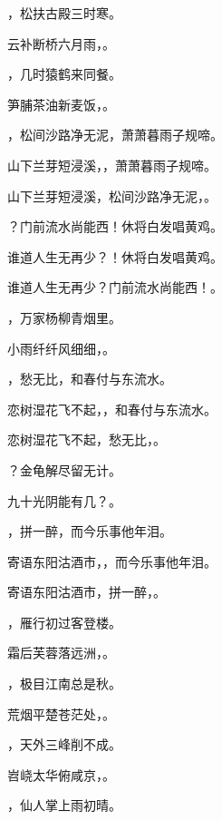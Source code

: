 \documentclass[12pt, a4paper, addpoints, answers]{exam}
\begin{document}
\begin{questions}
\question[3] ，松扶古殿三时寒。

\question[3] 云补断桥六月雨，。

\question[3] ，几时猿鹤来同餐。

\question[3] 笋脯茶油新麦饭，。

\question[3] ，松间沙路净无泥，萧萧暮雨子规啼。

\question[3] 山下兰芽短浸溪，，萧萧暮雨子规啼。

\question[3] 山下兰芽短浸溪，松间沙路净无泥，。

\question[3] ？门前流水尚能西！休将白发唱黄鸡。

\question[3] 谁道人生无再少？！休将白发唱黄鸡。

\question[3] 谁道人生无再少？门前流水尚能西！。

\question[3] ，万家杨柳青烟里。

\question[3] 小雨纤纤风细细，。

\question[3] ，愁无比，和春付与东流水。

\question[3] 恋树湿花飞不起，，和春付与东流水。

\question[3] 恋树湿花飞不起，愁无比，。

\question[3] ？金龟解尽留无计。

\question[3] 九十光阴能有几？。

\question[3] ，拼一醉，而今乐事他年泪。

\question[3] 寄语东阳沽酒市，，而今乐事他年泪。

\question[3] 寄语东阳沽酒市，拼一醉，。

\question[3] ，雁行初过客登楼。

\question[3] 霜后芙蓉落远洲，。

\question[3] ，极目江南总是秋。

\question[3] 荒烟平楚苍茫处，。

\question[3] ，天外三峰削不成。

\question[3] 岧峣太华俯咸京，。

\question[3] ，仙人掌上雨初晴。


\end{questions}
\end{document}
